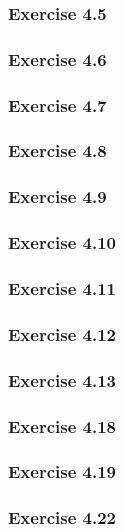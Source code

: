 \subsubsection{Exercise 4.5}

\subsubsection{Exercise 4.6}

\subsubsection{Exercise 4.7}

\subsubsection{Exercise 4.8}

\subsubsection{Exercise 4.9}

\subsubsection{Exercise 4.10}

\subsubsection{Exercise 4.11}

\subsubsection{Exercise 4.12}

\subsubsection{Exercise 4.13}

\subsubsection{Exercise 4.18}

\subsubsection{Exercise 4.19}

\subsubsection{Exercise 4.22}

